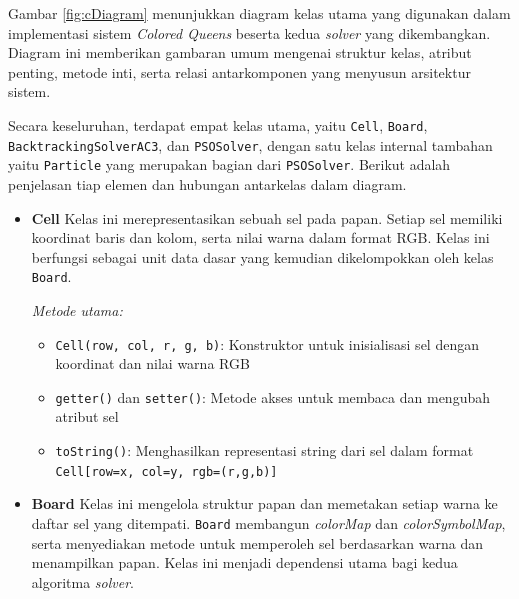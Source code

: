 \documentclass[a4paper,twoside]{article}
\begin{document}
	Gambar \ref{fig:cDiagram} menunjukkan diagram kelas utama yang digunakan dalam implementasi sistem \textit{Colored Queens} beserta kedua \textit{solver} yang dikembangkan. Diagram ini memberikan gambaran umum mengenai struktur kelas, atribut penting, metode inti, serta relasi antarkomponen yang menyusun arsitektur sistem.
	
	Secara keseluruhan, terdapat empat kelas utama, yaitu \texttt{Cell}, \texttt{Board}, \texttt{BacktrackingSolverAC3}, dan \texttt{PSOSolver}, dengan satu kelas internal tambahan yaitu \texttt{Particle} yang merupakan bagian dari \texttt{PSOSolver}. Berikut adalah penjelasan tiap elemen dan hubungan antarkelas dalam diagram.
	
	\begin{itemize}
		\item \textbf{Cell}  
		Kelas ini merepresentasikan sebuah sel pada papan. Setiap sel memiliki koordinat baris dan kolom, serta nilai warna dalam format RGB. Kelas ini berfungsi sebagai unit data dasar yang kemudian dikelompokkan oleh kelas \texttt{Board}.
		
		\textit{Metode utama:}
		\begin{itemize}
			\item \texttt{Cell(row, col, r, g, b)}: Konstruktor untuk inisialisasi sel dengan koordinat dan nilai warna RGB
			\item \texttt{getter()} dan \texttt{setter()}: Metode akses untuk membaca dan mengubah atribut sel
			\item \texttt{toString()}: Menghasilkan representasi string dari sel dalam format \texttt{Cell[row=x, col=y, rgb=(r,g,b)]}
		\end{itemize}
		
		\item \textbf{Board}  
		Kelas ini mengelola struktur papan dan memetakan setiap warna ke daftar sel yang ditempati. \texttt{Board} membangun \textit{colorMap} dan \textit{colorSymbolMap}, serta menyediakan metode untuk memperoleh sel berdasarkan warna dan menampilkan papan. Kelas ini menjadi dependensi utama bagi kedua algoritma \textit{solver}.
		

\end{itemize}
\end{document}
